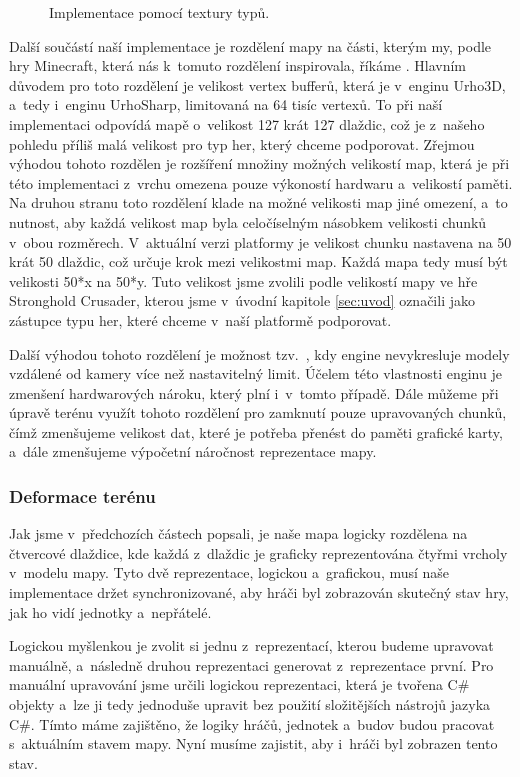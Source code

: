 \begin{figure}[h]
	\centering
	
	\caption{Implementace pomocí textury typů.}
	\label{fig:mapsmalltexture}
\end{figure}


Další součástí naší implementace je rozdělení mapy na části, kterým my, podle hry Minecraft, která nás k~tomuto rozdělení inspirovala, říkáme . Hlavním důvodem pro toto rozdělení je velikost vertex bufferů, která je v~enginu Urho3D, a~tedy i~enginu UrhoSharp, limitovaná na 64 tisíc vertexů. To při naší implementaci odpovídá mapě o~velikost 127 krát 127 dlaždic, což je z~našeho pohledu příliš malá velikost pro typ her, který chceme podporovat. Zřejmou výhodou tohoto rozdělen je rozšíření množiny možných velikostí map, která je při této implementaci z~vrchu omezena pouze výkoností hardwaru a~velikostí paměti. Na druhou stranu toto rozdělení klade na možné velikosti map jiné omezení, a~to nutnost, aby každá velikost map byla celočíselným násobkem velikosti chunků v~obou rozměrech. V~aktuální verzi platformy je velikost chunku nastavena na 50 krát 50 dlaždic, což určuje krok mezi velikostmi map. Každá mapa tedy musí být velikosti 50*x na 50*y. Tuto velikost jsme zvolili podle velikostí mapy ve hře Stronghold Crusader, kterou jsme v~úvodní kapitole \ref{sec:uvod} označili jako zástupce typu her, které chceme v~naší platformě podporovat.

Další výhodou tohoto rozdělení je možnost tzv.~, kdy engine nevykresluje modely vzdálené od kamery více než nastavitelný limit. Účelem této vlastnosti enginu je zmenšení hardwarových nároku, který plní i~v~tomto případě. Dále můžeme při úpravě terénu využít tohoto rozdělení pro zamknutí pouze upravovaných chunků, čímž zmenšujeme velikost dat, které je potřeba přenést do paměti grafické karty, a~dále zmenšujeme výpočetní náročnost reprezentace mapy.

\subsubsection{Deformace terénu}
Jak jsme v~předchozích částech popsali, je naše mapa logicky rozdělena na čtvercové dlaždice, kde každá z~dlaždic je graficky reprezentována čtyřmi vrcholy v~modelu mapy. Tyto dvě reprezentace, logickou a~grafickou, musí naše implementace držet synchronizované, aby hráči byl zobrazován skutečný stav hry, jak ho vidí jednotky a~nepřátelé. 

Logickou myšlenkou je zvolit si jednu z~reprezentací, kterou budeme upravovat manuálně, a~následně druhou reprezentaci generovat z~reprezentace první. Pro manuální upravování jsme určili logickou reprezentaci, která je tvořena C\# objekty a~lze ji tedy jednoduše upravit bez použití složitějších nástrojů jazyka C\#. Tímto máme zajištěno, že logiky hráčů, jednotek a~budov budou pracovat s~aktuálním stavem mapy. Nyní musíme zajistit, aby i~hráči byl zobrazen tento stav.

